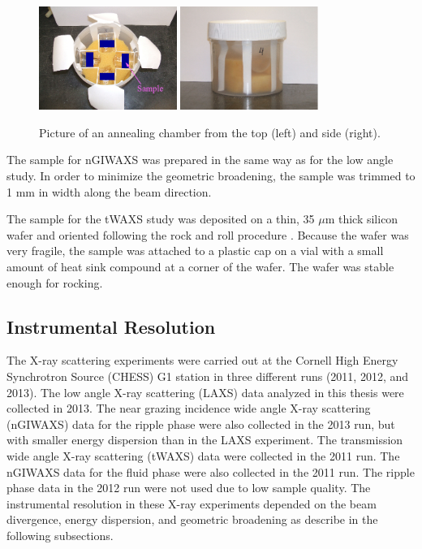 \begin{figure}[htbp]
  \centering
  \includegraphics[width=0.4\textwidth]{figures/ripple/MMs/annealing_chamber_topview}
  \quad
  \includegraphics[width=0.4\textwidth]{figures/ripple/MMs/annealing_chamber_sideview}  
  \caption[Picture of an annealing chamber
  from the top (left) and side (right)]
  {Picture of an annealing chamber
  from the top (left) and side (right).}
  \label{fig:annealing_chamber}
\end{figure}

The sample for nGIWAXS was prepared in the same way 
as for the low angle study. In order to minimize the geometric broadening, the 
sample was trimmed to 1 mm in width along the beam direction.

The sample for the tWAXS study was deposited on a thin, 35 $\mu$m thick silicon
wafer and oriented following the rock and roll procedure \cite{Tristram-Nagle07_MMB}.  
Because the wafer was very fragile, 
the sample was attached to a plastic cap on 
a vial with a small amount of heat sink compound at a corner of the 
wafer. The wafer was stable enough for rocking. 

\subsection{Instrumental Resolution}\label{sec:instrumental_resolution}
The X-ray scattering experiments were carried out at the Cornell 
High Energy Synchrotron Source (\acs{CHESS}) G1 station in three different runs
(2011, 2012, and 2013). 
The low angle X-ray scattering (LAXS) data analyzed 
in this thesis were collected in 2013.
The near grazing incidence wide angle X-ray scattering (nGIWAXS) data
for the ripple phase were also collected
in the 2013 run, but with smaller energy dispersion than in the LAXS experiment.
The transmission wide angle X-ray scattering (tWAXS) data were collected
in the 2011 run. The nGIWAXS data for the fluid phase were also collected in
the 2011 run.
The ripple phase data in the 2012 run were not used
due to low sample quality.
The instrumental resolution in these X-ray experiments depended on the beam
divergence, energy dispersion, and geometric broadening 
as describe in the following subsections.

